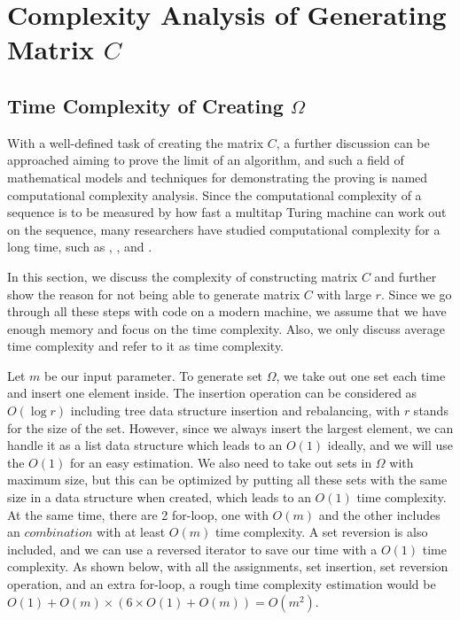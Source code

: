 \documentclass[11pt]{article}
\begin{document}
\section{Complexity Analysis of Generating Matrix $C$}
\subsection{Time Complexity of Creating $\Omega$}
With a well-defined task of creating the matrix $C$, a further discussion can be approached aiming to prove the limit of an algorithm, and such a field of mathematical models and techniques for demonstrating the proving is named computational complexity analysis. Since the computational complexity of a sequence is to be measured by how fast a multitap Turing machine can work out on the sequence\cite{hartmanis1965computational}, many researchers have studied computational complexity for a long time, such as \cite{10.5555/1074100.1074233}, \cite{papadimitriou2003computational}, \cite{du2011theory} and \cite{cook2007overview}.

In this section, we discuss the complexity of constructing matrix $C$ and further show the reason for not being able to generate matrix $C$ with large $r$. Since we go through all these steps with code on a modern machine, we assume that we have enough memory and focus on the time complexity. Also, we only discuss average time complexity and refer to it as time complexity.

Let $m$ be our input parameter. To generate set $\Omega$, we take out one set each time and insert one element inside. The insertion operation can be considered as $O(\log r)$\cite{doi:10.1137/S0097539791218202} including tree data structure insertion and rebalancing, with $r$ stands for the size of the set. However, since we always insert the largest element, we can handle it as a list data structure which leads to an $O(1)$ ideally, and we will use the $O(1)$ for an easy estimation. We also need to take out sets in $\Omega$ with maximum size, but this can be optimized by putting all these sets with the same size in a data structure when created, which leads to an $O(1)$ time complexity. At the same time, there are 2 for-loop, one with $O(m)$ and the other includes an $combination$ with at least $O(m)$ time complexity. A set reversion is also included, and we can use a reversed iterator to save our time with a $O(1)$ time complexity. As shown below, with all the assignments, set insertion, set reversion operation, and an extra for-loop, a rough time complexity estimation would be $O(1) + O(m) \times (6 \times O(1) + O(m)) = O(m^2)$.
\end{document}

